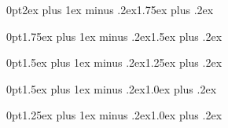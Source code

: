 %

\titlespacing*{\section}
{0pt}{2ex plus 1ex minus .2ex}{1.75ex plus .2ex}

\titlespacing*{\subsection}
{0pt}{1.75ex plus 1ex minus .2ex}{1.5ex plus .2ex}

\titlespacing*{\subsubsection}
{0pt}{1.5ex plus 1ex minus .2ex}{1.25ex plus .2ex}

\titlespacing*{\paragraph}
{0pt}{1.5ex plus 1ex minus .2ex}{1.0ex plus .2ex}

\titlespacing*{\subparagraph}
{0pt}{1.25ex plus 1ex minus .2ex}{1.0ex plus .2ex}

\setlength{\abovedisplayskip}{5pt}
\setlength{\belowdisplayskip}{5pt}

\setlength{\abovedisplayshortskip}{9pt}
\setlength{\belowdisplayshortskip}{9pt}

\setlength{\belowdisplayshortskip}{\belowdisplayskip}

\setlength{\baselineskip}{10pt}



\usepackage{caption}
\captionsetup{labelformat=empty}

\renewcommand\contentsname{\vspace*{-45pt}}



